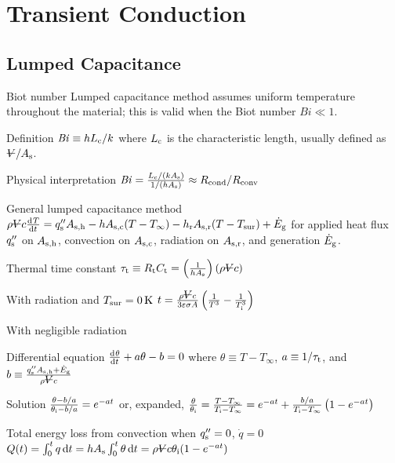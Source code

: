 \documentclass{article}
\begin{document}
\section{Transient Conduction}

\subsection{Lumped Capacitance}
\begin{description*}
\item[Biot number] Lumped capacitance method assumes uniform temperature throughout the material;
  this is valid when the Biot number \(\mathit{Bi} \ll 1\).
  \begin{description*}
  \item[Definition]
    \(\mathit{Bi} \equiv hL_{\mathrm{c}}/k\) where \(L_{\mathrm{c}}\) is the characteristic length,
    usually defined as \(\volsym / A_\mrm{s}\).
  \item[Physical interpretation]
    \(\mathit{Bi} = \frac{L_{\mathrm{c}}/(kA_{\mathrm{s}})}{1/(hA_{\mathrm{s}})}
    \approx R_{\mathrm{cond}}/R_{\mathrm{conv}}\)
  \end{description*}
\item[General lumped capacitance method]
  \(\rho \volsym c \od{T}{t}
  = q''_\mrm{s}A_\mrm{s,h} - hA_\mrm{s,c}(T-T_\infty)
  - h_\mrm{r}A_\mrm{s,r}(T-T_\mrm{sur}) + \dot{E}_\mrm{g}\)
  for applied heat flux \(q''_{\mathrm{s}}\) on \(A_{\mathrm{s,h}}\), convection on \(A_{\mathrm{s,c}}\),
  radiation on \(A_{\mathrm{s,r}}\), and generation \(\dot{E}_{\mathrm{g}}\).
\item[Thermal time constant]
  \(\tau_\mrm{t} \equiv R_\mrm{t}C_\mrm{t}
  = \left(\frac{1}{hA_\mrm{s}}\right)(\rho\volsym{}c)\)
\item[With radiation and \(T_{\mathrm{sur}}=\SI{0}{\kelvin}\)]
  \(t = \frac{\rho\volsym{}c}{3\varepsilon\sigma A}\left(\frac{1}{T^3}-\frac{1}{T_\mrm{i}^3}\right)\)
\item[With negligible radiation]~
  \begin{description*}
  \item[Differential equation]
    \(\od{\theta}{t} + a\theta - b = 0\) where
    \(\theta \equiv T-T_\infty\),
    \(a \equiv 1/\tau_{\mathrm{t}}\), and
    \(b \equiv \frac{q''_\mrm{s}A_\mrm{s,h}+\dot{E}_\mrm{g}}{\rho\volsym{}c}\)
  \item[Solution]
    \(\frac{\theta-b/a}{\theta_{\mathrm{i}}-b/a} = e^{-at}\) or, expanded,
    \(\frac{\theta}{\theta_{\mathrm{i}}} = \frac{T-T_\infty}{T_{\mathrm{i}}-T_\infty}
    = e^{-at} + \frac{b/a}{T_{\mathrm{i}}-T_\infty}\left(1-e^{-at}\right)\)
  \item[Total energy loss from convection when $q''_{\mathrm{s}}=0$, $\dot{q}=0$]
    \(Q(t) = \int_0^t q \dif{t}
    = hA_\mrm{s}\int_0^t\theta\dif{t}
    = \rho\volsym{}c\theta_\mrm{i}(1-e^{-at})\)
  \end{description*}
\end{description*}
\end{document}
